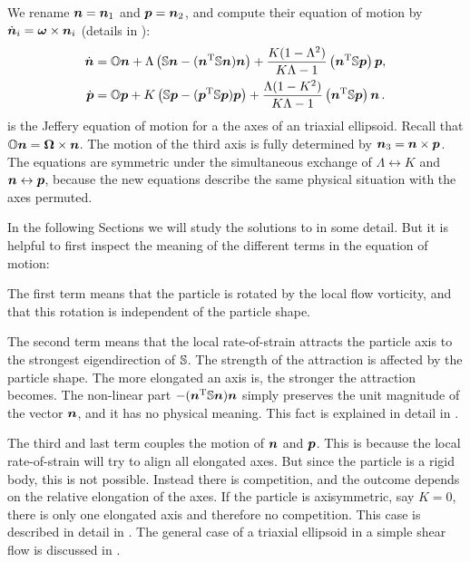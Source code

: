 \documentclass[thesis.tex]{subfiles}
\begin{document}
We rename $\mbox{\boldmath$n$} = \mbox{\boldmath$n$}_1$ and $\mbox{\boldmath$p$}=\mbox{\boldmath$n$}_2$, and compute their equation of motion by $\dot{\mbox{\boldmath$n$}}_i=\mbox{\boldmath$\omega$} \times \mbox{\boldmath$n$}_i$ (details in ):
\begin{align}
	\dot{\ve n}	&= \ma O \ve n 
	+ \Lambda\left(
	\ma S \ve n - (\ve n \transpose \ma S \ve n) \ve n
	\right)
    + \frac{K(1- \Lambda^2)}{K \Lambda - 1}\left(\ve n\transpose \ma S\ve p\right)\ve p,  \nn\\
\dot{\ve p}	&=    \ma O \ve p
	 + K\left(
\ma S \ve p  - (\ve p \transpose \ma S \ve p) \ve p
	 \right)
	  + \frac{\Lambda(1-K^2)}{K \Lambda - 1}\left(\ve n\transpose \ma S\ve p\right)\ve n\,. \eqnlab{np}
\end{align}
 is the Jeffery equation of motion for a the axes of an triaxial ellipsoid. Recall that $\mathbb{O} \mbox{\boldmath$n$}=\mbox{\boldmath$\Omega$} \times \mbox{\boldmath$n$}$. The motion of the third axis is fully determined by $\mbox{\boldmath$n$}_3 = \mbox{\boldmath$n$} \times \mbox{\boldmath$p$}$. The equations are symmetric under the simultaneous exchange of $\Lambda\leftrightarrow K$ and $\mbox{\boldmath$n$}\leftrightarrow\mbox{\boldmath$p$}$, because the new equations describe the same physical situation with the axes permuted.



In the following Sections we will study the solutions to  in some detail. But it is helpful to first inspect the meaning of the different terms in the equation of motion:

The first term means that the particle is rotated by the local flow vorticity, and that this rotation is independent of the particle shape.

The second term means that the local rate-of-strain attracts the particle axis to the strongest eigendirection of $\mathbb{S}$. The strength of the attraction is affected by the particle shape. The more elongated an axis is, the stronger the attraction becomes. The non-linear part $- (\mbox{\boldmath$n$} ^{\mathrm T} \mathbb{S} \mbox{\boldmath$n$}) \mbox{\boldmath$n$}$ simply preserves the unit magnitude of the vector $\mbox{\boldmath$n$}$, and it has no physical meaning. This fact is explained in detail in . 

The third and last term couples the motion of $\mbox{\boldmath$n$}$ and $\mbox{\boldmath$p$}$. This is because the local rate-of-strain will try to align all elongated axes. But since the particle is a rigid body, this is not possible. Instead there is competition, and the outcome depends on the relative elongation of the axes. If the particle is axisymmetric, say $K=0$, there is only one elongated axis and therefore no competition. This case is described in detail in . The general case of a triaxial ellipsoid in a simple shear flow is discussed in .
\end{document}
